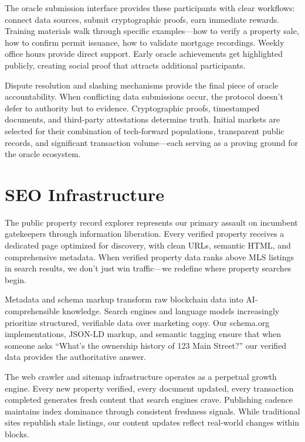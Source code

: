 The oracle submission interface provides these participants with clear workflows: connect data sources, submit cryptographic proofs, earn immediate rewards. Training materials walk through specific examples---how to verify a property sale, how to confirm permit issuance, how to validate mortgage recordings. Weekly office hours provide direct support. Early oracle achievements get highlighted publicly, creating social proof that attracts additional participants.

Dispute resolution and slashing mechanisms provide the final piece of oracle accountability. When conflicting data submissions occur, the protocol doesn't defer to authority but to evidence. Cryptographic proofs, timestamped documents, and third-party attestations determine truth. Initial markets are selected for their combination of tech-forward populations, transparent public records, and significant transaction volume---each serving as a proving ground for the oracle ecosystem.

\section{SEO Infrastructure}

The public property record explorer represents our primary assault on incumbent gatekeepers through information liberation. Every verified property receives a dedicated page optimized for discovery, with clean URLs, semantic HTML, and comprehensive metadata. When verified property data ranks above MLS listings in search results, we don't just win traffic---we redefine where property searches begin.

Metadata and schema markup transform raw blockchain data into AI-comprehensible knowledge. Search engines and language models increasingly prioritize structured, verifiable data over marketing copy. Our schema.org implementations, JSON-LD markup, and semantic tagging ensure that when someone asks ``What's the ownership history of 123 Main Street?'' our verified data provides the authoritative answer.

The web crawler and sitemap infrastructure operates as a perpetual growth engine. Every new property verified, every document updated, every transaction completed generates fresh content that search engines crave. Publishing cadence maintains index dominance through consistent freshness signals. While traditional sites republish stale listings, our content updates reflect real-world changes within blocks.

